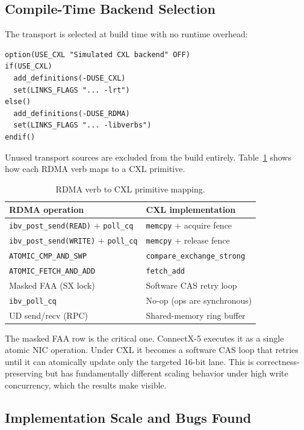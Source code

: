 \documentclass[10pt,twocolumn]{article}
\begin{document}
\subsection{Compile-Time Backend Selection}

The transport is selected at build time with no runtime overhead:

\begin{lstlisting}
option(USE_CXL "Simulated CXL backend" OFF)
if(USE_CXL)
  add_definitions(-DUSE_CXL)
  set(LINKS_FLAGS "... -lrt")
else()
  add_definitions(-DUSE_RDMA)
  set(LINKS_FLAGS "... -libverbs")
endif()
\end{lstlisting}

Unused transport sources are excluded from the build entirely.
Table~\ref{tab:verbmap} shows how each RDMA verb maps to a CXL primitive.

\begin{table}[H]
\centering
\footnotesize
\caption{RDMA verb to CXL primitive mapping.}
\label{tab:verbmap}
\begin{tabular}{ll}
\toprule
RDMA operation & CXL implementation \\
\midrule
\texttt{ibv\_post\_send(READ)} + \texttt{poll\_cq} & \texttt{memcpy} + acquire fence \\
\texttt{ibv\_post\_send(WRITE)} + \texttt{poll\_cq} & \texttt{memcpy} + release fence \\
\texttt{ATOMIC\_CMP\_AND\_SWP} & \texttt{compare\_exchange\_strong} \\
\texttt{ATOMIC\_FETCH\_AND\_ADD} & \texttt{fetch\_add} \\
Masked FAA (SX lock) & Software CAS retry loop \\
\texttt{ibv\_poll\_cq} & No-op (ops are synchronous) \\
UD send/recv (RPC) & Shared-memory ring buffer \\
\bottomrule
\end{tabular}
\end{table}

The masked FAA row is the critical one.
ConnectX-5 executes it as a single atomic NIC operation.
Under CXL it becomes a software CAS loop that retries until it can atomically
update only the targeted 16-bit lane.
This is correctness-preserving but has fundamentally different scaling
behavior under high write concurrency, which the results make visible.

\subsection{Implementation Scale and Bugs Found}
\end{document}
